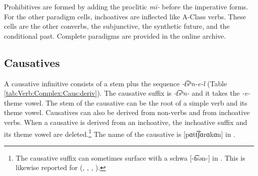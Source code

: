 Prohibitives are formed by adding the proclitic \textit{{mi-}} before the imperative forms. For the other paradigm cells, inchoatives are inflected like A-Class verbs. These cells are the other converbs, the subjunctive,   the synthetic future, and the conditional past. Complete paradigms are provided in the online archive.\largerpage[-2]

\subsection{Causatives}\label{section:verb:complex:caus}

A causative infinitive consists of a stem plus the sequence \textit{{-t͡sʰn-e-l}} (Table \ref{tab:Verb:Complex:Caus:deriv}). The causative suffix is \textit{{-t͡sʰn-}} and it takes the \textit{{-e-}} theme vowel. The stem of the causative can be the root of a simple verb and its theme vowel. Causatives can also be derived from non-verbs and from inchoative verbs. When a causative is derived from an inchoative, the inchoative suffix and its theme vowel are deleted.\footnote{The causative suffix can sometimes surface with a schwa [{-t͡sən-}] in  {\iaIA}. This is likewise reported for {\seaSE}   (\citealt[47]{Abeghyan-1933-Meter}, \citealt[163]{Gharagulyan-1974-BookArmenianOrthoepy}, \citeyear[42]{Gharagjulyan-1979-SchwaRules}, \citealt[59]{Margaryan-1997-ArmenianPhonology}).} The name of the causative is [pɑtt͡ʃɑrɑkɑn]  in {\seaSEA}. 




